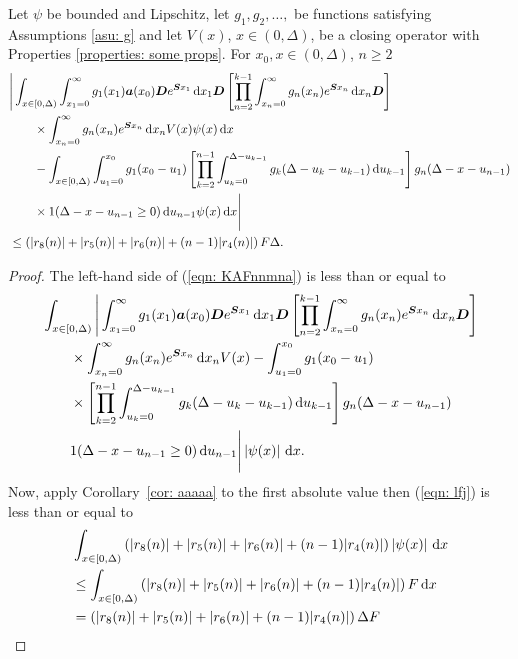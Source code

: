 \begin{cor}
	Let \(\psi\) be bounded and Lipschitz, let \(g_1,g_2,\dots,\) be functions satisfying Assumptions \ref{asu: g} and let \(V(x)\), \(x\in(0,\Delta)\), be a closing operator with Properties \ref{properties: some props}. For \(x_0,x\in(0,\Delta)\), \(n\geq 2\)
	\begin{align}
		&\Bigg| \int_{x\in[0,\Delta)} \int_{x_1=0}^\infty g_1(x_1) \boldsymbol a (x_0) \boldsymbol D e^{\boldsymbol{S}x_1}\, \mathrm{d} x_1\boldsymbol D 
            	\left[\prod_{n=2}^{k-1}\int_{x_n=0}^\infty g_n(x_n) e^{\boldsymbol{S}x_n} \, \mathrm{d} x_n
		\boldsymbol D\right] \nonumber 
            	\\&\qquad{}\times\int_{x_n=0}^\infty g_{n}(x_n) e^{\boldsymbol{S}x_n} \, \mathrm{d} x_n V(x) \psi(x)\, \mathrm{d} x \nonumber 
		\\&\qquad {}- \int_{x\in[0,\Delta)} \int_{u_1=0}^{x_0}g_1(x_0 - u_1)
		\left[\prod_{k=2}^{n-1} \int_{u_k=0}^{\Delta-u_{k-1}} g_k(\Delta-u_k-u_{k-1})\, \mathrm{d} u_{k-1}\right] \nonumber 
            	g_{n}(\Delta - x-u_{n-1})
	\\&\qquad{} \times1(\Delta-x-u_{n-1}\geq0)\, \mathrm{d} u_{n-1}\psi(x)\, \mathrm{d} x \Bigg| \nonumber
		\\&\leq \left(|r_8(n)|+|r_5(n)|+|r_6(n)| + (n-1)|r_4(n)|\right)F\Delta.\label{eqn: KAFnnmna}
	\end{align}
\end{cor}
\begin{proof}
	The left-hand side of (\ref{eqn: KAFnnmna}) is less than or equal to 
	\begin{align}
		& \int_{x\in[0,\Delta)} \Bigg| \int_{x_1=0}^\infty g_1(x_1) \boldsymbol a (x_0) \boldsymbol D e^{\boldsymbol{S}x_1}\, \mathrm{d} x_1\boldsymbol D 
            	\left[\prod_{n=2}^{k-1}\int_{x_n=0}^\infty g_n(x_n) e^{\boldsymbol{S}x_n} \, \mathrm{d} x_n
		\boldsymbol D\right] \nonumber 
            	\\&\qquad {}\times\int_{x_n=0}^\infty g_{n}(x_n) e^{\boldsymbol{S}x_n} \, \mathrm{d} x_n V(x)  \nonumber 
		- \int_{u_1=0}^{x_0}g_1(x_0 - u_1)
		\\&\qquad {}\times \left[\prod_{k=2}^{n-1} \int_{u_k=0}^{\Delta-u_{k-1}} g_k(\Delta-u_k-u_{k-1})\, \mathrm{d} u_{k-1}\right] \nonumber 
            	g_{n}(\Delta - x-u_{n-1})
	\\&\qquad{} 1(\Delta-x-u_{n-1}\geq0)\, \mathrm{d} u_{n-1}\Bigg| \left|\psi(x)\right|\, \mathrm{d} x . \label{eqn: lfj}
	\end{align}
	Now, apply Corollary~\ref{cor: aaaaa} to the first absolute value then (\ref{eqn: lfj}) is less than or equal to 
	\begin{align}
		&\int_{x\in[0,\Delta)} \left(|r_8(n)|+|r_5(n)|+|r_6(n)| + (n-1)|r_4(n)|\right) \left|\psi(x)\right|\, \mathrm{d} x  \nonumber 
		\\&\leq \int_{x\in[0,\Delta)} \left(|r_8(n)|+|r_5(n)|+|r_6(n)| + (n-1)|r_4(n)|\right) F\, \mathrm{d} x  \nonumber 
		\\&=  \left(|r_8(n)|+|r_5(n)|+|r_6(n)| + (n-1)|r_4(n)|\right) \Delta F
	\end{align}
\end{proof}

